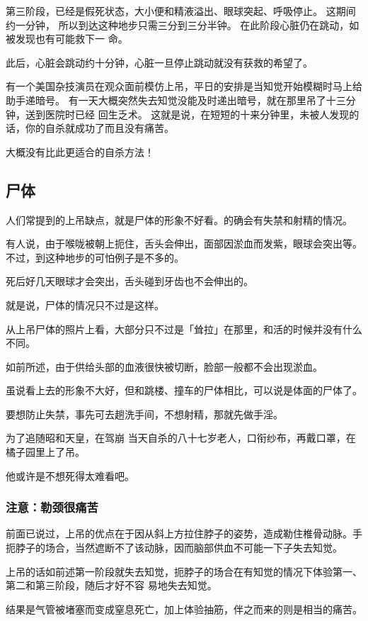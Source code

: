 \documentclass[UTF8]{ctexart}
\begin{document}
 第三阶段，已经是假死状态，大小便和精液溢出、眼球突起、呼吸停止。
这期间约一分钟， 所以到达这种地步只需三分到三分半钟。
在此阶段心脏仍在跳动，如被发现也有可能救下一 命。

此后，心脏会跳动约十分钟，心脏一旦停止跳动就没有获救的希望了。

有一个美国杂技演员在观众面前模仿上吊，平日的安排是当知觉开始模糊时马上给助手递暗号。
有一天大概突然失去知觉没能及时递出暗号，就在那里吊了十三分钟，送到医院时已经 回生乏术。
这就是说，在短短的十来分钟里，未被人发现的话，你的自杀就成功了而且没有痛苦。

大概没有比此更适合的自杀方法！

\subsection{尸体}
 
人们常提到的上吊缺点，就是尸体的形象不好看。的确会有失禁和射精的情况。

有人说，由于喉咙被朝上扼住，舌头会伸出，面部因淤血而发紫，眼球会突出等。不过，到这种地步的可怕例子是不多的。

死后好几天眼球才会突出，舌头碰到牙齿也不会伸出的。

就是说，尸体的情况只不过是这样。

从上吊尸体的照片上看，大部分只不过是「耸拉」在那里，和活的时候并没有什么不同。

如前所述，由于供给头部的血液很快被切断，脸部一般都不会出现淤血。

虽说看上去的形象不大好，但和跳楼、撞车的尸体相比，可以说是体面的尸体了。

要想防止失禁，事先可去趟洗手间，不想射精，那就先做手淫。

为了追随昭和天皇，在驾崩 当天自杀的八十七岁老人，口衔纱布，再戴口罩，在橘子园里上了吊。

他或许是不想死得太难看吧。

\subsubsection*{注意：勒颈很痛苦}

前面已说过，上吊的优点在于因从斜上方拉住脖子的姿势，造成勒住椎骨动脉。手扼脖子的场合，当然遮断不了该动脉，因而脑部供血不可能一下子失去知觉。

上吊的话如前述第一阶段就失去知觉，扼脖子的场合在有知觉的情况下体验第一、第二和第三阶段，随后才好不容
易地失去知觉。

结果是气管被堵塞而变成窒息死亡，加上体验抽筋，伴之而来的则是相当的痛苦。
\end{document}
